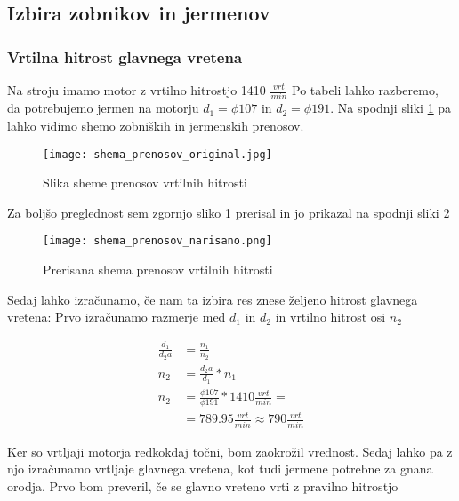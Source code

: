 \subsection{Izbira zobnikov in jermenov}
\subsubsection{Vrtilna hitrost glavnega vretena}
Na stroju imamo motor z vrtilno hitrostjo 1410 \( \frac{vrt}{min} \)
Po tabeli  lahko razberemo, da potrebujemo jermen na motorju
\( d_1 = \phi 107 \) in \( d_2 = \phi 191 \).
Na spodnji sliki \ref{slika_prenosov} pa lahko vidimo shemo
zobniških in jermenskih prenosov.

\begin{figure}[H]
	\begin{center}
		\texttt{[image: shema\_prenosov\_original.jpg]}
		\caption{Slika sheme prenosov vrtilnih hitrosti
			\cite{gauthier}}
		\label{slika_prenosov}
	\end{center}
\end{figure}

Za boljšo preglednost sem zgornjo sliko \ref{slika_prenosov}
prerisal in jo prikazal na spodnji sliki \ref{skica_prenosov}

\begin{figure}[H]
	\begin{center}
		\texttt{[image: shema\_prenosov\_narisano.png]}
		\caption{Prerisana shema prenosov vrtilnih hitrosti
			\cite{lasten}}
		\label{skica_prenosov}
	\end{center}
\end{figure}

Sedaj lahko izračunamo, če nam ta izbira res znese željeno hitrost glavnega vretena:
Prvo izračunamo razmerje med \( d_1 \) in \( d_2 \) in vrtilno hitrost osi \(n_2\)

\begin{equation}
	\label{eq:8}
	\begin{split}
		\frac{d_1}{d_2a} &= \frac{n_1}{n_2} \\
		n_2 &= \frac{d_2a}{d_1} * n_1 \\
		n_2 &= \frac{\phi 107}{\phi 191} * 1410 \frac{vrt}{min} = \\
		&= 789.95 \frac{vrt}{min} \approx 790 \frac{vrt}{min}
	\end{split}
\end{equation}

Ker so vrtljaji motorja redkokdaj točni, bom zaokrožil vrednost. Sedaj
lahko pa z njo izračunamo vrtljaje glavnega vretena, kot tudi jermene
potrebne za gnana orodja. Prvo bom preveril, če se glavno vreteno vrti z
pravilno hitrostjo

